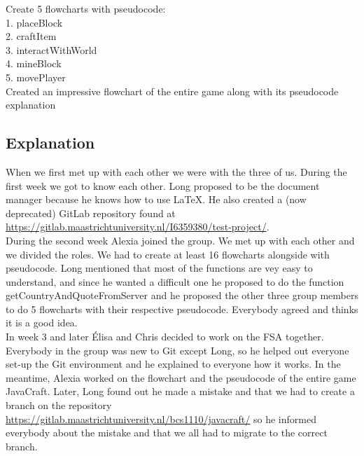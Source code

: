 Create 5 flowcharts with pseudocode: \\
1. placeBlock \\
2. craftItem \\
3. interactWithWorld \\
4. mineBlock \\
5. movePlayer \\
Created an impressive flowchart of the entire game along with its pseudocode explanation

\subsection{Explanation}

When we first met up with each other we were with the three of us. During the first week we got to know each other. Long proposed to be the document manager because he knows how to use LaTeX. He also created a (now deprecated) GitLab repository found at \url{https://gitlab.maastrichtuniversity.nl/I6359380/test-project/}. \\
During the second week Alexia joined the group. We met up with each other and we divided the roles. We had to create at least 16 flowcharts alongside with pseudocode. Long mentioned that most of the functions are vey easy to understand, and since he wanted a difficult one he proposed to do the function getCountryAndQuoteFromServer and he proposed the other three group members to do 5 flowcharts with their respective pseudocode. Everybody agreed and thinks it is a good idea. \\
In week 3 and later Élisa and Chris decided to work on the FSA together. Everybody in the group was new to Git except Long, so he helped out everyone set-up the Git environment and he explained to everyone how it works.  In the meantime, Alexia worked on the flowchart and the pseudocode of the entire game JavaCraft. Later, Long found out he made a mistake and that we had to create a branch on the repository \url{https://gitlab.maastrichtuniversity.nl/bcs1110/javacraft/} so he informed everybody about the mistake and that we all had to migrate to the correct branch.